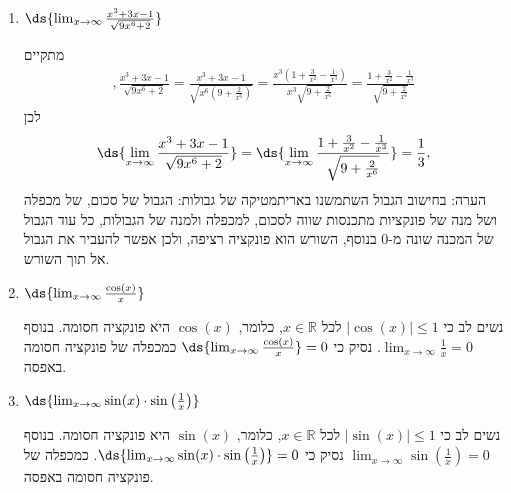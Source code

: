 \begin{enumerate}
\item $\ds{ \lim_{x \to \infty}\frac{x^3+3x-1}{\sqrt{9x^6+2}}}$
\ifsol
\begin{solbox}
מתקיים
\begin{align*}
    ,\frac{x^3+3x-1}{\sqrt{9x^6+2}}=\frac{x^3+3x-1}{\sqrt{x^6(9+\tfrac{2}{x^6})}}
    = \frac{x^3(1+\tfrac{3}{x^2}-\tfrac{1}{x^3})}{x^3\sqrt{9+\tfrac{2}{x^6}}}
    = \frac{1+\tfrac{3}{x^2}-\tfrac{1}{x^3}}{\sqrt{9+\tfrac{2}{x^6}}}
\end{align*}
לכן
\begin{align*}
    \ds{ \lim_{x \to \infty}\frac{x^3+3x-1}{\sqrt{9x^6+2}}}= \ds{ \lim_{x \to \infty}\frac{1+\tfrac{3}{x^2}-\tfrac{1}{x^3}}{\sqrt{9+\tfrac{2}{x^6}}}}
    = \frac{1}{3},
\end{align*}
הערה: בחישוב הגבול השתמשנו באריתמטיקה של גבולות: הגבול של סכום, של מכפלה ושל מנה של פונקציות מתכנסות שווה לסכום, למכפלה ולמנה של הגבולות, כל עוד הגבול של המכנה שונה מ-$0$ בנוסף, השורש הוא פונקציה רציפה, ולכן אפשר להעביר את הגבול אל תוך השורש.
\end{solbox}
\fi

\item $\ds{\lim_{x\to\infty}\frac{\cos(x)}{x}}$
\ifsol
{}
\begin{solbox}
נשים לב כי
$|\cos(x)|\leq 1$
לכל
$x\in\mathbb{R}$,
כלומר,
$\cos(x)$
היא פונקציה חסומה. בנוסף
$\displaystyle\lim_{x\to\infty}\frac{1}{x}=0$.
נסיק כי
$\ds{\lim_{x\to\infty}\frac{\cos(x)}{x}}=0$
כמכפלה של פונקציה חסומה באפסה.
\end{solbox}
\fi

\item $\ds{\lim_{x\to\infty}\sin(x)\cdot\sin\left(\tfrac{1}{x}\right)}$
\ifsol
{}
\begin{solbox}
נשים לב כי
$|\sin(x)|\leq 1$
לכל
$x\in\mathbb{R}$,
כלומר,
$\sin(x)$
היא פונקציה חסומה. בנוסף
$\displaystyle\lim_{x\to\infty}\sin\left(\frac{1}{x}\right)=0$
נסיק כי
$\ds{\lim_{x\to\infty}\sin(x)\cdot\sin\left(\tfrac{1}{x}\right)}=0$.
כמכפלה של פונקציה חסומה באפסה.
\end{solbox}
\fi


\end{enumerate}
